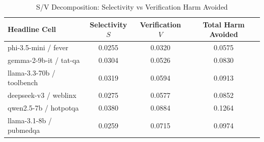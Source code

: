 \begin{table}[h]
\centering
\small
\caption{S/V Decomposition: Selectivity vs Verification Harm Avoided}
\label{tab:rebuttal_preview_sv_decomposition}
\begin{tabular}{l|cc|c}
\hline
Headline Cell & Selectivity $S$ & Verification $V$ & Total Harm Avoided \\
\hline
phi-3.5-mini / fever & 0.0255 & 0.0320 & 0.0575 \\
gemma-2-9b-it / tat-qa & 0.0304 & 0.0526 & 0.0830 \\
llama-3.3-70b / toolbench & 0.0319 & 0.0594 & 0.0913 \\
deepseek-v3 / weblinx & 0.0275 & 0.0577 & 0.0852 \\
qwen2.5-7b / hotpotqa & 0.0380 & 0.0884 & 0.1264 \\
llama-3.1-8b / pubmedqa & 0.0259 & 0.0715 & 0.0974 \\
\hline
\end{tabular}
\end{table}

